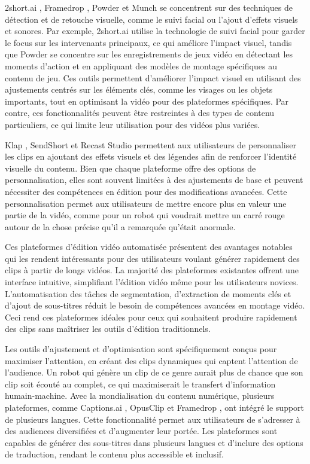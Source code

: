 2short.ai \cite{short2024}, Framedrop \cite{framedrop2024}, Powder \cite{powder2024} et Munch \cite{munch2024} se concentrent sur des techniques de détection et de retouche visuelle, comme le suivi facial ou l’ajout d’effets visuels et sonores. Par exemple, 2short.ai utilise la technologie de suivi facial pour garder le focus sur les intervenants principaux, ce qui améliore l’impact visuel, tandis que Powder \cite{powder2024} se concentre sur les enregistrements de jeux vidéo en détectant les moments d’action et en appliquant des modèles de montage spécifiques au contenu de jeu. Ces outils permettent d’améliorer l’impact visuel en utilisant des ajustements centrés sur les éléments clés, comme les visages ou les objets importants, tout en optimisant la vidéo pour des plateformes spécifiques. Par contre, ces fonctionnalités peuvent être restreintes à des types de contenu particuliers, ce qui limite leur utilisation pour des vidéos plus variées.

Klap \cite{klap2024}, SendShort \cite{sendshort2024} et Recast Studio \cite{recast2024} permettent aux utilisateurs de personnaliser les clips en ajoutant des effets visuels et des légendes afin de renforcer l’identité visuelle du contenu. Bien que chaque plateforme offre des options de personnalisation, elles sont souvent limitées à des ajustements de base et peuvent nécessiter des compétences en édition pour des modifications avancées. Cette personnalisation permet aux utilisateurs de mettre encore plus en valeur une partie de la vidéo, comme pour un robot qui voudrait mettre un carré rouge autour de la chose précise qu’il a remarquée qu’était anormale.

Ces plateformes d’édition vidéo automatisée présentent des avantages notables qui les rendent intéressants pour des utilisateurs voulant générer rapidement des clips à partir de longs vidéos. La majorité des plateformes existantes offrent une interface intuitive, simplifiant l’édition vidéo même pour les utilisateurs novices. L’automatisation des tâches de segmentation, d’extraction de moments clés et d’ajout de sous-titres réduit le besoin de compétences avancées en montage vidéo. Ceci rend ces plateformes idéales pour ceux qui souhaitent produire rapidement des clips sans maîtriser les outils d’édition traditionnels.

Les outils d’ajustement et d’optimisation sont spécifiquement conçus pour maximiser l’attention, en créant des clips dynamiques qui captent l’attention de l’audience. Un robot qui génère un clip de ce genre aurait plus de chance que son clip soit écouté au complet, ce qui maximiserait le transfert d’information humain-machine. Avec la mondialisation du contenu numérique, plusieurs plateformes, comme Captions.ai \cite{captions2024}, OpusClip \cite{opusclip2024} et Framedrop \cite{framedrop2024}, ont intégré le support de plusieurs langues. Cette fonctionnalité permet aux utilisateurs de s’adresser à des audiences diversifiées et d’augmenter leur portée. Les plateformes sont capables de générer des sous-titres dans plusieurs langues et d’inclure des options de traduction, rendant le contenu plus accessible et inclusif.

